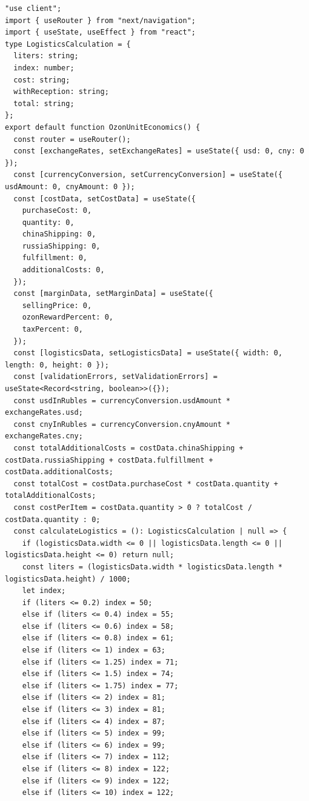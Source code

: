 \begin{code}
\vspace{-0.75cm}\begin{verbatim}
"use client";
import { useRouter } from "next/navigation";
import { useState, useEffect } from "react";
type LogisticsCalculation = {
  liters: string;
  index: number;
  cost: string;
  withReception: string;
  total: string;
};
export default function OzonUnitEconomics() {
  const router = useRouter();
  const [exchangeRates, setExchangeRates] = useState({ usd: 0, cny: 0 });
  const [currencyConversion, setCurrencyConversion] = useState({ usdAmount: 0, cnyAmount: 0 });
  const [costData, setCostData] = useState({
    purchaseCost: 0,
    quantity: 0,
    chinaShipping: 0,
    russiaShipping: 0,
    fulfillment: 0,
    additionalCosts: 0,
  });
  const [marginData, setMarginData] = useState({
    sellingPrice: 0,
    ozonRewardPercent: 0,
    taxPercent: 0,
  });
  const [logisticsData, setLogisticsData] = useState({ width: 0, length: 0, height: 0 });
  const [validationErrors, setValidationErrors] = useState<Record<string, boolean>>({});
  const usdInRubles = currencyConversion.usdAmount * exchangeRates.usd;
  const cnyInRubles = currencyConversion.cnyAmount * exchangeRates.cny;
  const totalAdditionalCosts = costData.chinaShipping + costData.russiaShipping + costData.fulfillment + costData.additionalCosts;
  const totalCost = costData.purchaseCost * costData.quantity + totalAdditionalCosts;
  const costPerItem = costData.quantity > 0 ? totalCost / costData.quantity : 0;
  const calculateLogistics = (): LogisticsCalculation | null => {
    if (logisticsData.width <= 0 || logisticsData.length <= 0 || logisticsData.height <= 0) return null;
    const liters = (logisticsData.width * logisticsData.length * logisticsData.height) / 1000;
    let index;
    if (liters <= 0.2) index = 50;
    else if (liters <= 0.4) index = 55;
    else if (liters <= 0.6) index = 58;
    else if (liters <= 0.8) index = 61;
    else if (liters <= 1) index = 63;
    else if (liters <= 1.25) index = 71;
    else if (liters <= 1.5) index = 74;
    else if (liters <= 1.75) index = 77;
    else if (liters <= 2) index = 81;
    else if (liters <= 3) index = 81;
    else if (liters <= 4) index = 87;
    else if (liters <= 5) index = 99;
    else if (liters <= 6) index = 99;
    else if (liters <= 7) index = 112;
    else if (liters <= 8) index = 122;
    else if (liters <= 9) index = 122;
    else if (liters <= 10) index = 122;

\end{verbatim}
\end{code}
